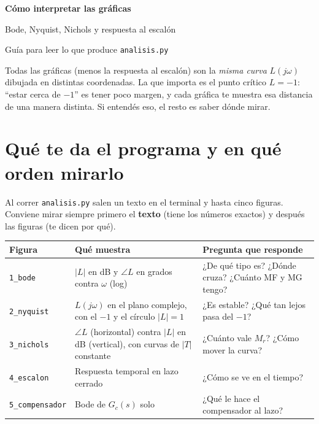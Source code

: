 \documentclass[11pt,a4paper]{article}
\newcommand{\Mr}{M_r}
\newcommand{\arch}[1]{\texttt{#1}}
\begin{document}
\begin{center}
{\LARGE\bfseries\color{azul} Cómo interpretar las gráficas\par}
\vspace{4pt}
{\large Bode, Nyquist, Nichols y respuesta al escalón\par}
\vspace{2pt}
{\small\color{gris} Guía para leer lo que produce \texttt{analisis.py}\par}
\end{center}
\vspace{4pt}

\begin{idea}
Todas las gráficas (menos la respuesta al escalón) son la \emph{misma curva} $L(j\omega)$ dibujada en distintas
coordenadas. La que importa es el punto crítico $L=-1$: ``estar cerca de $-1$'' es tener poco margen, y cada gráfica
te muestra esa distancia de una manera distinta. Si entendés eso, el resto es saber dónde mirar.
\end{idea}

\section{Qué te da el programa y en qué orden mirarlo}

Al correr \texttt{analisis.py} salen un texto en el terminal y hasta cinco figuras. Conviene mirar siempre primero el
\textbf{texto} (tiene los números exactos) y después las figuras (te dicen por qué).

\begin{center}
\small
\begin{tabularx}{\textwidth}{@{}l>{\raggedright\arraybackslash}X>{\raggedright\arraybackslash}X@{}}
\toprule
Figura & Qué muestra & Pregunta que responde\\
\midrule
\arch{1\_bode} & $|L|$ en dB y $\angle L$ en grados contra $\omega$ (log) & ¿De qué tipo es? ¿Dónde cruza? ¿Cuánto MF y MG tengo? \\
\arch{2\_nyquist} & $L(j\omega)$ en el plano complejo, con el $-1$ y el círculo $|L|=1$ & ¿Es estable? ¿Qué tan lejos pasa del $-1$? \\
\arch{3\_nichols} & $\angle L$ (horizontal) contra $|L|$ en dB (vertical), con curvas de $|T|$ constante & ¿Cuánto vale $\Mr$? ¿Cómo mover la curva? \\
\arch{4\_escalon} & Respuesta temporal en lazo cerrado & ¿Cómo se ve en el tiempo? \\
\arch{5\_compensador} & Bode de $G_c(s)$ solo & ¿Qué le hace el compensador al lazo? \\
\bottomrule
\end{tabularx}
\end{center}
\end{document}
